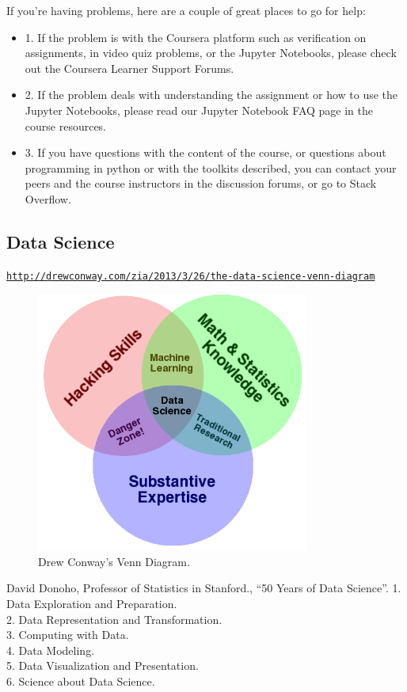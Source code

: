 \documentclass[11pt]{article}
\begin{document}
If you're having problems, here are a couple of great places to go for help:
\begin{itemize}
\item{1. If the problem is with the Coursera platform such as
verification on assignments, in video quiz problems, or the Jupyter
Notebooks, please check out the Coursera Learner Support Forums.}
\item{2. If the problem deals with understanding the assignment or how
to use the Jupyter Notebooks, please read our Jupyter Notebook FAQ
page in the course resources.}
\item{3. If you have questions with the content of the course, or
questions about programming in python or with the toolkits described,
you can contact your peers and the course instructors in the
discussion forums, or go to Stack Overflow.}
\end{itemize}

\subsection{Data Science}
\href{http://drewconway.com/zia/2013/3/26/the-data-science-venn-diagram}{\tt http://drewconway.com/zia/2013/3/26/the-data-science-venn-diagram}

\begin{figure}[p]
    \includegraphics[width=0.8\textwidth]{Data_Science_VD.png} 
 \caption{Drew Conway's Venn Diagram.}
    \label{fig:DS_Venn}
\end{figure}

David Donoho, Professor of Statistics in Stanford., ``50 Years of Data Science''. 
1. Data Exploration and Preparation.\\
2. Data Representation and Transformation. \\
3. Computing with Data. \\
4. Data Modeling.\\
5. Data Visualization and Presentation. \\
6. Science about Data Science. \\
\end{document}
